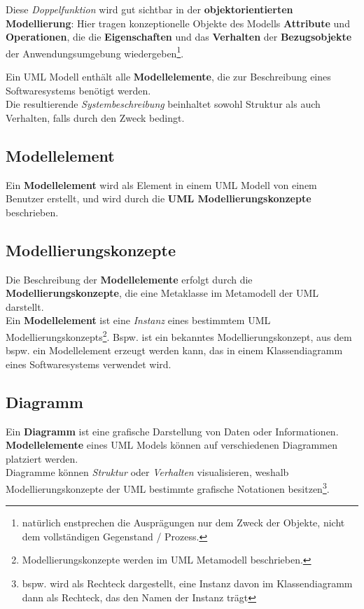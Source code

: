 \noindent
Diese \textit{Doppelfunktion} wird gut sichtbar in der \textbf{objektorientierten Modellierung}: Hier tragen konzeptionelle Objekte des Modells \textbf{Attribute} und \textbf{Operationen}, die die \textbf{Eigenschaften} und das \textbf{Verhalten} der \textbf{Bezugsobjekte} der Anwendungsumgebung wiedergeben\footnote{
    natürlich enstprechen die Ausprägungen nur dem Zweck der Objekte, nicht dem vollständigen Gegenstand / Prozess.
}.

\noindent
Ein UML Modell enthält alle \textbf{Modellelemente}, die zur Beschreibung eines Softwaresystems benötigt werden.\\
Die resultierende \textit{Systembeschreibung} beinhaltet sowohl Struktur als auch Verhalten, falls durch den Zweck bedingt.

\subsection*{Modellelement}
Ein \textbf{Modellelement} wird als Element in einem UML Modell von einem Benutzer erstellt, und wird durch die \textbf{UML Modellierungskonzepte} beschrieben.

\subsection*{Modellierungskonzepte}
Die Beschreibung der \textbf{Modellelemente} erfolgt durch die \textbf{Modellierungskonzepte}, die eine Metaklasse im Metamodell der UML darstellt.\\
Ein \textbf{Modellelement} ist eine \textit{Instanz} eines bestimmtem UML Modellierungskonzepts\footnote{
Modellierungskonzepte werden im UML Metamodell beschrieben.
}.
Bspw. ist  ein bekanntes Modellierungskonzept, aus dem bspw. ein Modellelement  erzeugt werden kann, das in einem Klassendiagramm eines Softwaresystems verwendet wird.

\subsection*{Diagramm}
Ein \textbf{Diagramm} ist eine grafische Darstellung von Daten oder Informationen.\\
\textbf{Modellelemente} eines UML Models können auf verschiedenen Diagrammen platziert werden.\\
Diagramme können \textit{Struktur} oder \textit{Verhalten} visualisieren, weshalb Modellierungskonzepte der UML bestimmte grafische Notationen besitzen\footnote{
bspw. wird  als Rechteck dargestellt, eine Instanz davon im Klassendiagramm dann als Rechteck, das den Namen der Instanz trägt
}.

